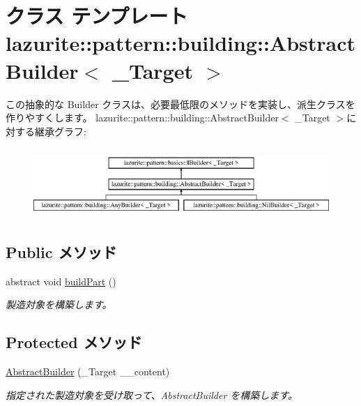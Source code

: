 \hypertarget{classlazurite_1_1pattern_1_1building_1_1_abstract_builder_3_01___target_01_4}{
\section{クラス テンプレート lazurite::pattern::building::AbstractBuilder$<$ \_\-Target $>$}
\label{classlazurite_1_1pattern_1_1building_1_1_abstract_builder_3_01___target_01_4}
}


この抽象的な Builder クラスは、必要最低限のメソッドを実装し、派生クラスを作りやすくします。  
lazurite::pattern::building::AbstractBuilder$<$ \_\-Target $>$に対する継承グラフ:\begin{figure}[H]
\begin{center}
\leavevmode
\includegraphics[height=2.65823cm]{classlazurite_1_1pattern_1_1building_1_1_abstract_builder_3_01___target_01_4}
\end{center}
\end{figure}
\subsection*{Public メソッド}
\begin{DoxyCompactItemize}
\item 
abstract void \hyperlink{classlazurite_1_1pattern_1_1building_1_1_abstract_builder_3_01___target_01_4_a4ddf3d66757e93e0a410708fff784801}{buildPart} ()
\begin{DoxyCompactList}\small\item\em 製造対象を構築します。 \item\end{DoxyCompactList}\end{DoxyCompactItemize}
\subsection*{Protected メソッド}
\begin{DoxyCompactItemize}
\item 
\hyperlink{classlazurite_1_1pattern_1_1building_1_1_abstract_builder_3_01___target_01_4_a9dc60f080d297e7852f209f1e122c306}{AbstractBuilder} (\_\-Target \_\-\_\-content)
\begin{DoxyCompactList}\small\item\em 指定された製造対象を受け取って、AbstractBuilder を構築します。 \item\end{DoxyCompactList}\end{DoxyCompactItemize}
